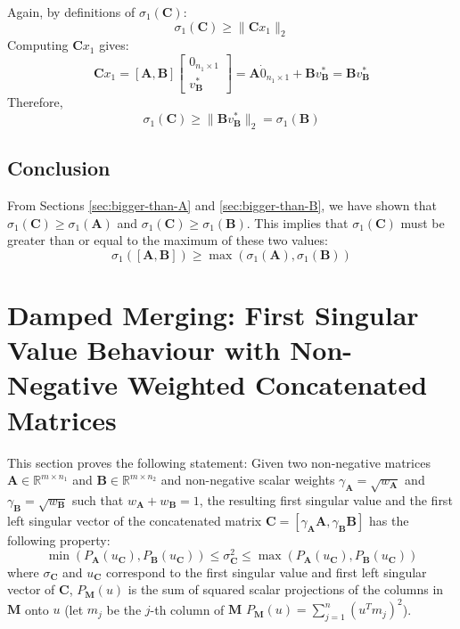 Again, by definitions of $\sigma_1(\mathbf{C})$:
\[ \sigma_1(\mathbf{C}) \geq \parallel \mathbf{C}x_1 \parallel_2 \]
Computing $\mathbf{C}x_1$ gives:
\[ \mathbf{C}x_1 = [\mathbf{A}, \mathbf{B}] \begin{bmatrix} 0_{n_1 \times 1} \\
v_{\mathbf{B}}^* \end{bmatrix} = \mathbf{A} \dot 0_{n_1 \times 1} + \mathbf{B}
v_{\mathbf{B}}^* = \mathbf{B}v_{\mathbf{B}}^* \]
Therefore,
\[ \sigma_1(\mathbf{C}) \geq \parallel \mathbf{B}v_{\mathbf{B}}^* \parallel_2 =
\sigma_1(\mathbf{B})\]

\subsection{Conclusion}
From Sections \ref{sec:bigger-than-A} and \ref{sec:bigger-than-B}, we have shown
that $\sigma_1(\mathbf{C}) \geq \sigma_1(\mathbf{A})$ and $\sigma_1(\mathbf{C})
\geq \sigma_1(\mathbf{B})$. This implies that $\sigma_1(\mathbf{C})$ must be
greater than or equal to the maximum of these two values:
\[ \sigma_1([\mathbf{A}, \mathbf{B}]) \geq \max(\sigma_1(\mathbf{A}),
\sigma_1(\mathbf{B})) \]

\section{Damped Merging: First Singular Value Behaviour with Non-Negative
Weighted Concatenated Matrices}
\label{sec:app-scale}
This section proves the following statement:
Given two non-negative matrices $\mathbf{A} \in \mathbb{R}^{m \times n_1}$ and
$\mathbf{\mathbf{B}} \in \mathbb{R}^{m \times n_2}$ and non-negative scalar weights
$\gamma_{\mathbf{A}} = \sqrt{w_{\mathbf{A}}}$ and $\gamma_{\mathbf{\mathbf{B}}} =
\sqrt{w_{\mathbf{\mathbf{B}}}}$ such that $w_{\mathbf{A}} + w_{\mathbf{\mathbf{B}}} = 1$, the
resulting first singular value and the first left
singular vector of the concatenated matrix $\mathbf{C} = [\gamma_{\mathbf{A}}\mathbf{A},
\gamma_{\mathbf{\mathbf{B}}}\mathbf{\mathbf{B}}]$ has the following property:
\[ \min(P_{\mathbf{A}}(u_{\mathbf{C}}),P_{\mathbf{\mathbf{B}}}(u_{\mathbf{C}})) \leq \sigma_{\mathbf{C}}^2 \leq
\max(P_{\mathbf{A}}(u_{\mathbf{C}}),P_{\mathbf{\mathbf{B}}}(u_{\mathbf{C}})) \]
where $\sigma_{\mathbf{C}}$ and $u_{\mathbf{C}}$ correspond to the first singular value and first
left singular vector of $\mathbf{C}$, $P_{\mathbf{M}}(u)$ is the sum of squared scalar projections
of the columns in $\mathbf{M}$ onto $u$ (let $m_j$ be the $j$-th column of $\mathbf{M}$ $P_{\mathbf{M}}(u)
= \sum_{j=1}^n (u^T m_j)^2$).

